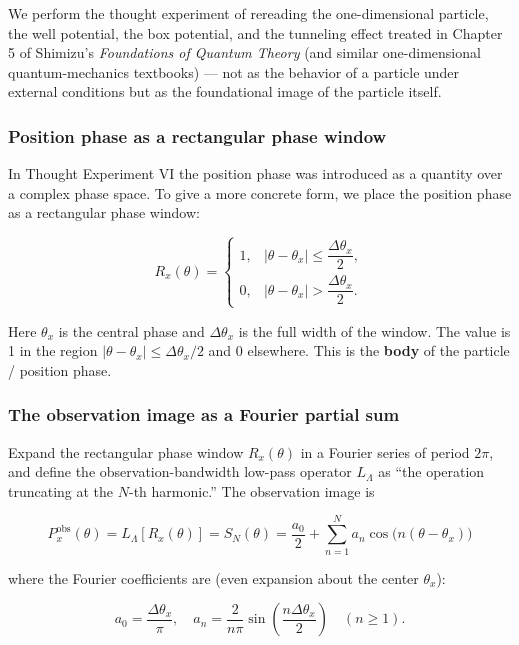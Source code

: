 \documentclass[
]{article}
\begin{document}
We perform the thought experiment of rereading the one-dimensional
particle, the well potential, the box potential, and the tunneling
effect treated in Chapter 5 of Shimizu's \emph{Foundations of Quantum
Theory} (and similar one-dimensional quantum-mechanics textbooks) ---
not as the behavior of a particle under external conditions but as the
foundational image of the particle itself.

\subsubsection{Position phase as a rectangular phase
window}\label{position-phase-as-a-rectangular-phase-window}

In Thought Experiment VI the position phase was introduced as a quantity
over a complex phase space. To give a more concrete form, we place the
position phase as a rectangular phase window:

\[
R_x(\theta) = \begin{cases}
1, & |\theta - \theta_x| \leq \dfrac{\Delta\theta_x}{2}, \\
0, & |\theta - \theta_x| > \dfrac{\Delta\theta_x}{2}.
\end{cases}
\]

Here \(\theta_x\) is the central phase and \(\Delta\theta_x\) is the
full width of the window. The value is 1 in the region
\(|\theta - \theta_x| \leq \Delta\theta_x/2\) and 0 elsewhere. This is
the \textbf{body} of the particle / position phase.

\subsubsection{The observation image as a Fourier partial
sum}\label{the-observation-image-as-a-fourier-partial-sum}

Expand the rectangular phase window \(R_x(\theta)\) in a Fourier series
of period \(2\pi\), and define the observation-bandwidth low-pass
operator \(L_\Lambda\) as ``the operation truncating at the \(N\)-th
harmonic.'' The observation image is

\[
P_x^{\mathrm{obs}}(\theta) = L_\Lambda[R_x(\theta)] = S_N(\theta) = \frac{a_0}{2} + \sum_{n=1}^{N} a_n \cos\bigl(n(\theta - \theta_x)\bigr)
\]

where the Fourier coefficients are (even expansion about the center
\(\theta_x\)):

\[
a_0 = \frac{\Delta\theta_x}{\pi}, \quad a_n = \frac{2}{n\pi}\sin\!\left(\frac{n\Delta\theta_x}{2}\right) \quad (n \geq 1).
\]
\end{document}
